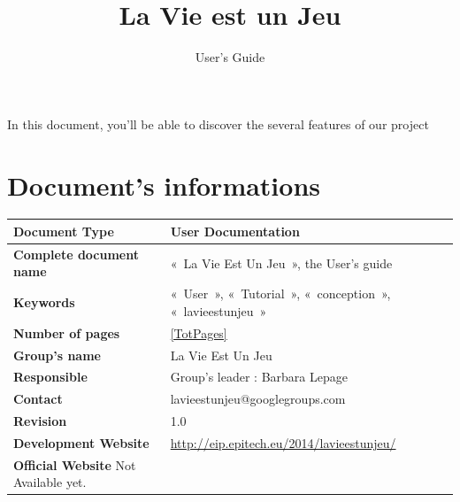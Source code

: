 \documentclass{life-en}
\begin{document}
\title{La Vie est un Jeu}
\subtitle{User's Guide}

\summary
{
	In this document, you'll be able to discover the several features
	of our project 
}

\maketitle
\authorspage


\chapter*{Document's informations}

\begin{tabular}{ | m{5cm} | m{10cm} | }
	\hline
	\textbf{Document Type} & User Documentation\\ %
	\hline
	\textbf{Complete document name} & «~La Vie Est Un Jeu~», the User's guide\\ %
	\hline
	\textbf{Keywords} & «~User~», «~Tutorial~», «~conception~», «~lavieestunjeu~»\\ %
	\hline
	\textbf{Number of pages} & \ref{TotPages} \\
	\hline
	\textbf{Group's name} & La Vie Est Un Jeu\\
	\hline
	\textbf{Responsible} & Group's leader : Barbara Lepage\\
	\hline
	\textbf{Contact} & lavieestunjeu@googlegroups.com\\
	\hline
	\textbf{Revision} & 1.0\\ %
	\hline
	\textbf{Development Website} & \url{http://eip.epitech.eu/2014/lavieestunjeu/}\\
	\hline
	\textbf{Official Website} Not Available yet.\\
	\hline
\end{tabular}
\end{document}
